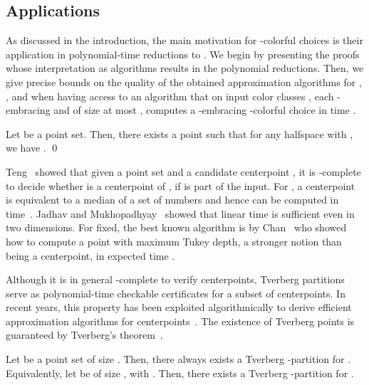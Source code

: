 \subsection{Applications}
\label{sec:kcol:applications}

As discussed in the introduction, the main motivation for -colorful
choices is their application in polynomial-time reductions to \CCP. We
begin by presenting the proofs whose interpretation as algorithms 
results in the polynomial reductions. Then, we give precise 
bounds on the quality of the
obtained approximation algorithms for \Centerpoint, \Tverberg, and
\ColKirchberger when having access to an algorithm that on input 
color classes , each -embracing and of size at 
most , computes a -embracing -colorful choice in time .


\begin{theorem}\label{thm:centerpoint}
Let  be a point set. Then, there exists a point  such that for any halfspace  with , we 
have . \qed
\end{theorem}

Teng~\cite[Theorem~8.4]{Teng1991} showed that given a point set 
 and a candidate centerpoint , it is 
\coNP-complete to decide whether  is
a centerpoint of , if  is part of the input. 
For , a centerpoint is equivalent to a median of a set of 
numbers and hence can be computed in  
time~\cite{BlumFlPrRiTa1973}. Jadhav and Mukhopadhyay~\cite{JadhavMu1994} 
showed that linear time is sufficient even in two dimensions. For 
 fixed, the best known algorithm is by Chan~\cite{Chan2004} 
who showed how to compute a point with maximum Tukey depth,
a stronger notion than being a centerpoint, in expected time 
.

Although it is in general \coNP-complete to verify centerpoints, Tverberg
partitions serve as
polynomial-time checkable certificates for a subset of centerpoints.
In recent years, this property has been exploited algorithmically to derive
efficient approximation algorithms for
centerpoints~\cite{MulzerWe2013,MillerSh2010}.
The existence of Tverberg points is guaranteed by Tverberg's
theorem~\cite{Tverberg1966}.

\begin{theorem}\label{thm:tverberg}
  Let  be a point set of size . Then, there 
  always exists a
  Tverberg -partition for .
  Equivalently, let  be of size , with . 
  Then, there exists a Tverberg -partition for .
\end{theorem}

